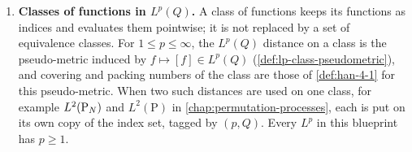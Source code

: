 \begin{enumerate}
  \item \textbf{Classes of functions in $L^p(Q)$.} A class of functions keeps its functions as indices and evaluates them pointwise; it is not replaced by a set of equivalence classes. For $1\le p\le\infty$, the $L^p(Q)$ distance on a class is the pseudo-metric induced by $f\mapsto[f]\in L^p(Q)$ (\cref{def:lp-class-pseudometric}), and covering and packing numbers of the class are those of \cref{def:han-4-1} for this pseudo-metric. When two such distances are used on one class, for example $L^2(\mathrm{P}_N)$ and $L^2(\mathrm P)$ in \cref{chap:permutation-processes}, each is put on its own copy of the index set, tagged by $(p,Q)$. Every $L^p$ in this blueprint has $p\ge1$.
\end{enumerate}
